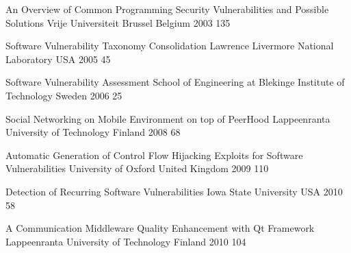 \renewcommand{\refname}{\MakeUppercase{\ReferencesTitle}}
\cleardoublepage
{}
{}

\begin{comment}
INSTRUCTIONS FOR WRITING A MASTER'S THESIS

References are either in alphabetical order (according to the first author) or in the order of
citing. All references are in one list only. All bibliographic information is included. If a
reference is a thesis then the type of the thesis is included in the reference, i.e. mention
either “bachelor’s thesis”, “master’s thesis” or “doctoral thesis”.
\end{comment}

\begin{thebibliography}{9}


		{}
		{An Overview of Common Programming Security Vulnerabilities and Possible Solutions}
		{Vrije Universiteit Brussel}
		{Belgium}
		{2003}
		{135}
	
		{}
		{Software Vulnerability Taxonomy Consolidation}
		{Lawrence Livermore National Laboratory}
		{USA}
		{2005}
		{45}
	
		{}
		{Software Vulnerability Assessment}
		{School of Engineering at Blekinge Institute of Technology}
		{Sweden}
		{2006}
		{25}
	
		{}
		{Social Networking on Mobile Environment on top of PeerHood}
		{Lappeenranta University of Technology}
		{Finland}
		{2008}
		{68}
	
		{}
		{Automatic Generation of Control Flow Hijacking Exploits for Software Vulnerabilities}
		{University of Oxford}
		{United Kingdom}
		{2009}
		{110}
	
		{}
		{Detection of Recurring Software Vulnerabilities}
		{Iowa State University}
		{USA}
		{2010}
		{58}
	
		{}
		{A Communication Middleware Quality Enhancement with {Qt} Framework}
		{Lappeenranta University of Technology}
		{Finland}
		{2010}
		{104}


\end{thebibliography}
